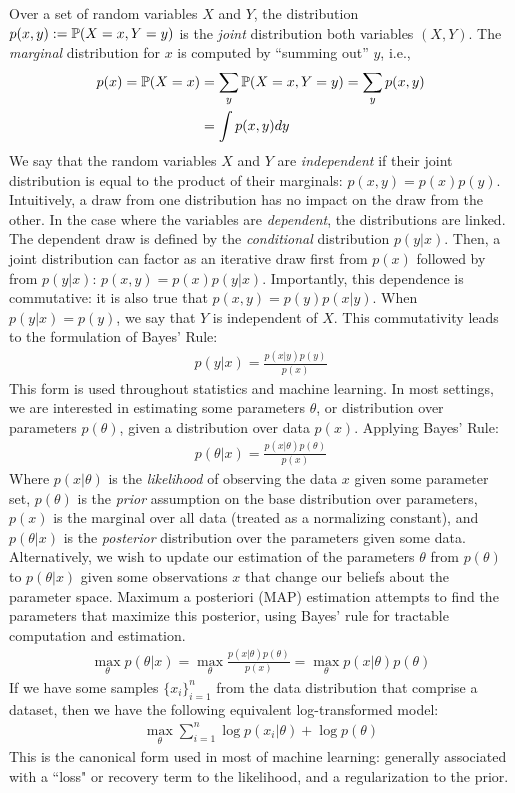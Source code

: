 Over a set of random variables $X$ and $Y$, the distribution $p(x,y):= \mathbb{P}(X=x,Y=y)$ is the \textit{joint} distribution both variables $(X,Y)$. The \textit{marginal} distribution for $x$ is computed by ``summing out'' $y$, i.e.,
\begin{align}
p(x) = \mathbb{P}(X=x) &= \sum_y \mathbb{P}(X=x,Y=y) = \sum_y p(x,y) \\
&= \int p(x,y) dy
\end{align}
We say that the random variables $X$ and $Y$ are \textit{independent} if their joint distribution is equal to the product of their marginals: $p(x,y) = p(x)p(y)$.
Intuitively, a draw from one distribution has no impact on the draw from the other. In the case where the variables are \textit{dependent}, the distributions are linked. The dependent draw is defined by the \textit{conditional} distribution $p(y|x)$. Then, a joint distribution can factor as an iterative draw first from $p(x)$ followed by from $p(y|x)$: $p(x,y) = p(x)p(y|x)$. Importantly, this dependence is commutative: it is also true that $p(x,y) = p(y)p(x|y)$. When $p(y|x) = p(y)$, we say that $Y$ is independent of $X$. This commutativity leads to the formulation of Bayes' Rule:
\begin{align}
    p(y|x) = \frac{p(x|y)p(y)}{p(x)}
\end{align}
This form is used throughout statistics and machine learning. In most settings, we are interested in estimating some parameters $\theta$, or distribution over parameters $p(\theta)$, given a distribution over data $p(x)$. Applying Bayes' Rule:
\begin{align}
    p(\theta|x) = \frac{p(x|\theta)p(\theta)}{p(x)}
\end{align}
Where $p(x|\theta)$ is the \textit{likelihood} of observing the data $x$ given some parameter set, $p(\theta)$ is the \textit{prior} assumption on the base distribution over parameters, $p(x)$ is the marginal over all data (treated as a normalizing constant), and $p(\theta|x)$ is the \textit{posterior} distribution over the parameters given some data.
Alternatively, we wish to update our estimation of the parameters $\theta$ from $p(\theta)$ to $p(\theta|x)$ given some observations $x$ that change our beliefs about the parameter space.
Maximum a posteriori (MAP) estimation attempts to find the parameters that maximize this posterior, using Bayes' rule for tractable computation and estimation.
\begin{align}\label{eq:map}
	\max_\theta p(\theta|x) = \max_\theta \frac{p(x|\theta)p(\theta)}{p(x)} =  \max_\theta p(x|\theta)p(\theta)
\end{align}
If we have some samples $\{x_i\}_{i=1}^n$ from the data distribution that comprise a dataset,
then we have the following equivalent log-transformed model:
\begin{align}
	\max_\theta \sum_{i=1}^n \log p(x_i|\theta) + \log p(\theta)
\end{align}
This is the canonical form used in most of machine learning: generally associated with a ``loss" or recovery term to the likelihood, and a regularization to the prior.

